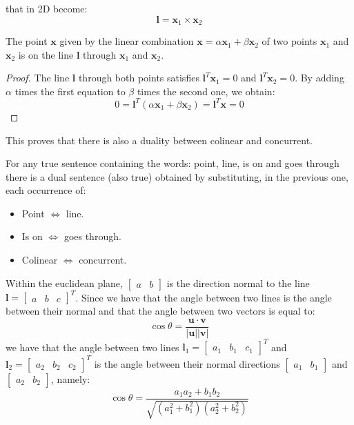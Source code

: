 \documentclass[12pt, a4paper]{report}
\begin{document}
    that in 2D become: 
    \[\boldsymbol{l}=\boldsymbol{x}_1 \times \boldsymbol {x}_2\] 
    \begin{example}[Property]
        The point $\boldsymbol{x}$ given by the linear combination $\boldsymbol{x}=\alpha\boldsymbol{x}_1+\beta\boldsymbol{x}_2$ of two points $\boldsymbol{x}_1$ and $\boldsymbol{x}_2$ is on the 
        line $\boldsymbol{l}$ through $\boldsymbol{x}_1$ and $\boldsymbol{x}_2$. 
    \end{example}
    \begin{proof}
        The line $\boldsymbol{l}$ through both points satisfies $\boldsymbol{l}^T\boldsymbol{x}_1=0$ and  $\boldsymbol{l}^T\boldsymbol{x}_2=0$. By adding $\alpha$ times the first 
        equation to $\beta$ times the second one, we obtain: 
        \[0=\boldsymbol{l}^T\left( \alpha\boldsymbol{x}_1+\beta\boldsymbol{x}_2 \right)=\boldsymbol{l}^T\boldsymbol{x}=0\]
    \end{proof}
    This proves that there is also a duality between colinear and concurrent. 
    \begin{theorem}
        For any true sentence containing the words: point, line, is on and goes through there is a dual sentence (also true) obtained by substituting, in the previous one, each 
        occurrence of: 
        \begin{itemize}
            \item Point $\Leftrightarrow$ line. 
            \item Is on $\Leftrightarrow$ goes through.
            \item Colinear $\Leftrightarrow$ concurrent. 
        \end{itemize}
    \end{theorem}
    Within the euclidean plane, $\begin{bmatrix} a & b \end{bmatrix}$ is the direction normal to the line $\boldsymbol{l}={\begin{bmatrix} a & b & c \end{bmatrix}}^T$. Since we have that
    the angle between two lines is the angle between their normal and that the angle between two vectors is equal to:
    \[\cos\theta=\dfrac{\boldsymbol{u} \cdot \boldsymbol{v}}{\left\lvert \boldsymbol{u} \right\rvert \left\lvert \boldsymbol{v} \right\rvert}\] 
    we have that the angle between two lines $\boldsymbol{l}_1={\begin{bmatrix} a_1 & b_1 & c_1 \end{bmatrix}}^T$ and $\boldsymbol{l}_2={\begin{bmatrix} a_2 & b_2 & c_2 \end{bmatrix}}^T$ 
    is the angle between their normal directions $\begin{bmatrix} a_1 & b_1 \end{bmatrix}$ and $\begin{bmatrix} a_2 & b_2 \end{bmatrix}$, namely: 
    \[\cos\theta=\dfrac{a_1a_2+b_1b_2}{\sqrt{\left( a_1^2 + b_1^2 \right)\left( a_2^2 + b_2^2 \right)}}\]
    
\end{document}
